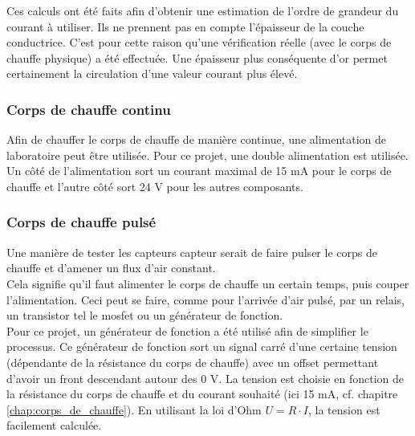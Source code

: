 Ces calculs ont été faits afin d'obtenir une estimation de l'ordre de grandeur du courant à utiliser. Ils ne prennent pas en compte l'épaisseur 
de la couche conductrice. C'est pour cette raison qu'une vérification réelle (avec le corps de chauffe physique) a été effectuée. Une épaisseur 
plus conséquente d'or permet certainement la circulation d'une valeur courant plus élevé. 

\subsubsection{Corps de chauffe continu}
Afin de chauffer le corps de chauffe de manière continue, une alimentation de laboratoire peut être utilisée. Pour ce projet, une double 
alimentation est utilisée. Un côté de l'alimentation sort un courant maximal de 15 mA pour le corps de chauffe et l'autre côté sort 24 V pour 
les autres composants. 

\subsubsection{Corps de chauffe pulsé}
\label{chap:corps_chauffe_pulse}
Une manière de tester les capteurs \gls{capteur} serait de faire pulser le corps de chauffe et d'amener un flux d'air constant. \\
Cela signifie qu'il faut alimenter le corps de chauffe un certain temps, puis couper l'alimentation. Ceci peut se faire, comme pour l'arrivée
d'air pulsé, par un relais, un transistor tel le \gls{mosfet} ou un générateur de fonction. \\

Pour ce projet, un générateur de fonction a été utilisé afin de simplifier le processus. Ce générateur de fonction sort un signal carré
d'une certaine tension (dépendante de la résistance du corps de chauffe) avec un offset permettant d'avoir un front descendant autour des
0 V. La tension est choisie en fonction de la résistance du corps de chauffe et du courant souhaité (ici 15 mA, cf. chapitre 
\ref{chap:corps_de_chauffe}). En utilisant la loi d'Ohm $U = R\cdot I$, la tension est facilement calculée.

